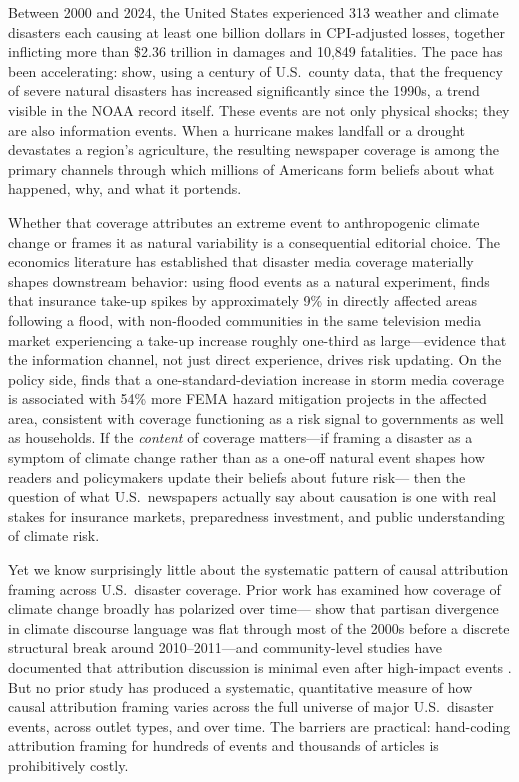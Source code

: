 \documentclass[12pt]{article}
\begin{document}
Between 2000 and 2024, the United States experienced 313 weather and
climate disasters each causing at least one billion dollars in
CPI-adjusted losses, together inflicting more than \$2.36 trillion in
damages and 10,849 fatalities.  The pace has been accelerating:
\citet{boustan2020} show, using a century of U.S.\ county data, that
the frequency of severe natural disasters has increased significantly
since the 1990s, a trend visible in the NOAA record itself.  These
events are not only physical shocks; they are also information events.
When a hurricane makes landfall or a drought devastates a region's
agriculture, the resulting newspaper coverage is among the primary
channels through which millions of Americans form beliefs about what
happened, why, and what it portends.

Whether that coverage attributes an extreme event to anthropogenic
climate change or frames it as natural variability is a consequential
editorial choice.  The economics literature has established that
disaster media coverage materially shapes downstream behavior: using
flood events as a natural experiment, \citet{gallagher2014} finds that
insurance take-up spikes by approximately 9\% in directly affected
areas following a flood, with non-flooded communities in the same
television media market experiencing a take-up increase roughly
one-third as large---evidence that the information channel, not just
direct experience, drives risk updating.  On the policy side,
\citet{magontier2020} finds that a one-standard-deviation increase in
storm media coverage is associated with 54\% more FEMA hazard
mitigation projects in the affected area, consistent with coverage
functioning as a risk signal to governments as well as households.  If
the \emph{content} of coverage matters---if framing a disaster as a
symptom of climate change rather than as a one-off natural event shapes
how readers and policymakers update their beliefs about future risk---
then the question of what U.S.\ newspapers actually say about
causation is one with real stakes for insurance markets, preparedness
investment, and public understanding of climate risk.

Yet we know surprisingly little about the systematic pattern of causal
attribution framing across U.S.\ disaster coverage.  Prior work has
examined how coverage of climate change broadly has polarized over
time---\citet{chinn2020} show that partisan divergence in climate
discourse language was flat through most of the 2000s before a discrete
structural break around 2010--2011---and community-level studies have
documented that attribution discussion is minimal even after high-impact
events \citep{boudet2020}.  But no prior study has produced a
systematic, quantitative measure of how causal attribution framing
varies across the full universe of major U.S.\ disaster events, across
outlet types, and over time.  The barriers are practical: hand-coding
attribution framing for hundreds of events and thousands of articles is
prohibitively costly.
\end{document}
